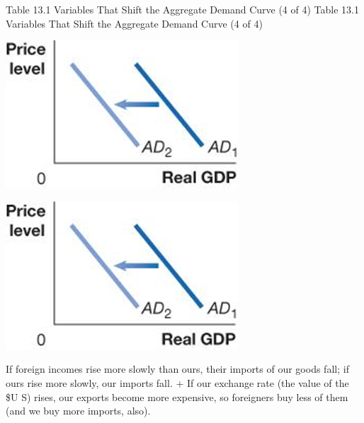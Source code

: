 \documentclass[
  12pt,
  ignorenonframetext,
]{beamer}
\begin{document}
\begin{frame}{Table 13.1 Variables That Shift the Aggregate Demand Curve
(4 of 4)}
\protect\hypertarget{table-13.1-variables-that-shift-the-aggregate-demand-curve-4-of-4}{}
Table 13.1 Variables That Shift the Aggregate Demand Curve (4 of 4)

\includegraphics[width=\textwidth,height=0.99\textheight]{imgs3/img_slide16a.png}

\includegraphics[width=\textwidth,height=0.99\textheight]{imgs3/img_slide16b.png}

If foreign incomes rise more slowly than ours, their imports of our
goods fall; if ours rise more slowly, our imports fall. + If our
exchange rate (the value of the \$U S) rises, our exports become more
expensive, so foreigners buy less of them (and we buy more imports,
also).
\end{frame}
\end{document}
